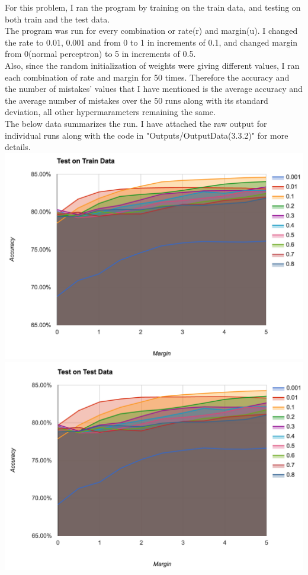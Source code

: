 \documentclass[12pt, fullpage,letterpaper]{article}
\begin{document}
For this problem, I ran the program by training on the train data, and testing on both train and the test data.\\
The program was run for every combination or rate(r) and margin(u). I changed the rate to 0.01, 0.001 and from 0 to 1 in increments of 0.1, and changed margin from 0(normal perceptron) to 5 in increments of 0.5.\\
Also, since the random initialization of weights were giving different values, I ran each combination of rate and margin for 50 times. Therefore the accuracy and the number of mistakes' values that I have mentioned is the average accuracy and the average number of mistakes over the 50 runs along with its standard deviation, all other hypermarameters remaining the same.\\
The below data summarizes the run. I have attached the raw output for individual runs along with the code in "Outputs/OutputData(3.3.2)" for more details.\\
\includegraphics[scale=0.4]{332Train.png}
\includegraphics[scale=0.4]{332Test.png}\\
\end{document}
